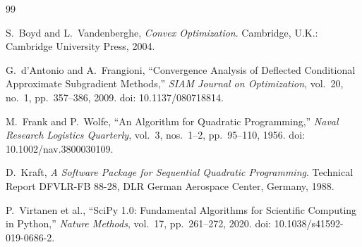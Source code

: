 \documentclass[12pt]{article}
\begin{document}
\begin{thebibliography}{99}

S.~Boyd and L.~Vandenberghe,
\emph{Convex Optimization}.
Cambridge, U.K.: Cambridge University Press, 2004.

G.~d'Antonio and A.~Frangioni,
``Convergence Analysis of Deflected Conditional Approximate
Subgradient Methods,''
\emph{SIAM Journal on Optimization},
vol.~20, no.~1, pp.~357--386, 2009.
doi: 10.1137/080718814.

M.~Frank and P.~Wolfe,
``An Algorithm for Quadratic Programming,''
\emph{Naval Research Logistics Quarterly},
vol.~3, nos.~1--2, pp.~95--110, 1956.
doi: 10.1002/nav.3800030109.

D.~Kraft,
\emph{A Software Package for Sequential Quadratic Programming}.
Technical Report DFVLR-FB 88-28,
DLR German Aerospace Center, Germany, 1988.

P.~Virtanen et al.,
``SciPy 1.0: Fundamental Algorithms for Scientific Computing in
Python,''
\emph{Nature Methods},
vol.~17, pp.~261--272, 2020.
doi: 10.1038/s41592-019-0686-2.

\end{thebibliography}
\end{document}
